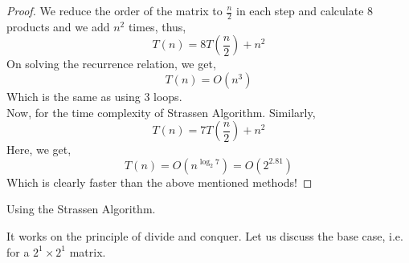 \begin{proof}
	We reduce the order of the matrix to $\frac{n}{2}$ in each step and calculate 8 products and we add $n^2$ times, thus,
	\[T(n)= 8T(\frac{n}{2})+n^2\]
	On solving the recurrence relation, we get,
	\[T(n)=O(n^3)\]
	Which is the same as using 3 loops.\\
	Now, for the time complexity of Strassen Algorithm. Similarly,
	\[T(n)=7T(\frac{n}{2})+n^2\]
	Here, we get,
	\[T(n)=O(n^{\log_2 7})=O(2^{2.81})\]
	Which is clearly faster than the above mentioned methods!
\end{proof}
\begin{eg}
	Using the Strassen Algorithm.
\end{eg}
\begin{explanation}
	It works on the principle of divide and conquer. Let us discuss the base case, i.e. for a $2^1\times 2^1$ matrix.
\end{explanation}


